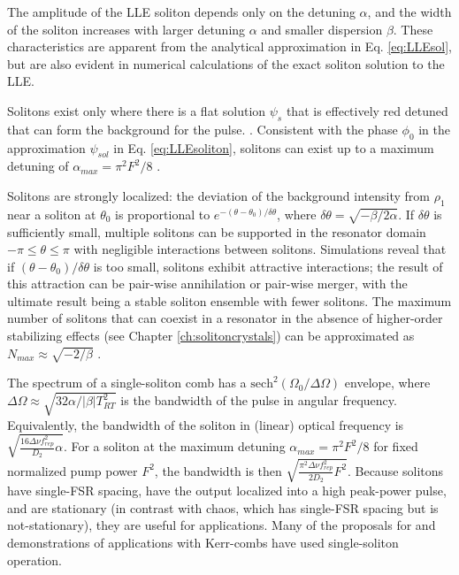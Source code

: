 {The amplitude of the LLE soliton depends only on the detuning $\alpha$, and the width of the soliton increases with larger detuning $\alpha$ and smaller dispersion $\beta$. These characteristics are apparent from the analytical approximation in Eq. \ref{eq:LLEsol}, but are also evident in numerical calculations of the exact soliton solution to the LLE\cite{Yi2015}.

Solitons exist only where there is a flat solution $\psi_s$ that is effectively red detuned that can form the background for the pulse\cite{Barashenkov1996,Coen2013}. . Consistent with the phase $\phi_0$ in the approximation $\psi_{sol}$ in Eq. \ref{eq:LLEsoliton}, solitons can exist up to a maximum detuning of $\alpha_{max}=\pi^2 F^2/8$ \cite{Herr2014}.


Solitons are strongly localized: the deviation of the background intensity from $\rho_1$ near a soliton at $\theta_0$ is proportional to $e^{-(\theta-\theta_0)/\delta\theta}$, where $\delta\theta=\sqrt{-\beta/2\alpha}$. If $\delta\theta$ is sufficiently small, multiple solitons can be supported in the resonator domain $-\pi\leq\theta\leq\pi$ with negligible interactions between solitons. Simulations reveal that if $(\theta-\theta_0)/\delta\theta$ is too small, solitons exhibit attractive interactions; the result of this attraction can be pair-wise annihilation or pair-wise merger, with the ultimate result being a stable soliton ensemble with fewer solitons. The maximum number of solitons that can coexist in a resonator in the absence of higher-order stabilizing effects (see Chapter \ref{ch:solitoncrystals}) can be approximated as $N_{max}\approx\sqrt{-2/\beta}$ \cite{Herr2014}.


The spectrum of a single-soliton comb has a $\mathrm{sech}^2(\Omega_0/\Delta \Omega)$ envelope, where $\Delta\Omega\approx\sqrt{32\alpha/|\beta| T_{RT}^2 }$ is the bandwidth of the pulse in angular frequency. Equivalently, the bandwidth of the soliton in (linear) optical frequency is $\sqrt{\frac{16\Delta\nu f_{rep}^2}{D_2}\alpha}$. For a soliton at the maximum detuning $\alpha_{max}=\pi^2F^2/8$ for fixed normalized pump power $F^2$, the bandwidth is then $\sqrt{\frac{\pi^2\Delta\nu f_{rep}^2}{2 D_2}F^2}$. Because solitons have single-FSR spacing, have the output localized into a high peak-power pulse, and are stationary (in contrast with chaos, which has single-FSR spacing but is not-stationary), they are useful for applications. Many of the proposals for and demonstrations of applications with Kerr-combs have used single-soliton operation. 

}
